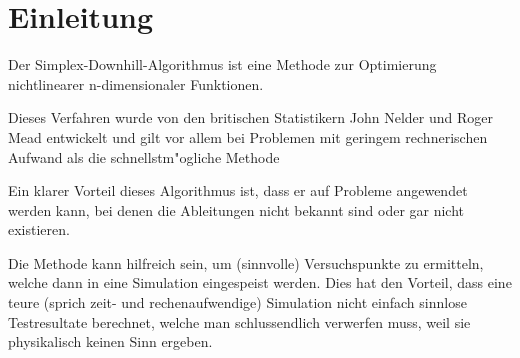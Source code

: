 \section{Einleitung}
Der Simplex-Downhill-Algorithmus ist eine Methode zur Optimierung
nichtlinearer n-dimensionaler Funktionen.

Dieses Verfahren wurde von den britischen Statistikern John Nelder und
Roger Mead entwickelt und gilt vor allem bei Problemen mit geringem
rechnerischen Aufwand als die schnellstm"ogliche Methode
\cite{bib:link2}

Ein  klarer Vorteil dieses Algorithmus ist, dass er auf Probleme
angewendet werden kann, bei denen  die Ableitungen nicht bekannt sind
oder gar nicht existieren.

Die Methode kann hilfreich sein, um (sinnvolle) Versuchspunkte zu
ermitteln, welche dann in eine Simulation eingespeist werden.
Dies hat den Vorteil, dass eine teure (sprich zeit- und rechenaufwendige)
Simulation nicht einfach sinnlose Testresultate berechnet, welche man
schlussendlich verwerfen muss, weil sie physikalisch keinen Sinn ergeben.
